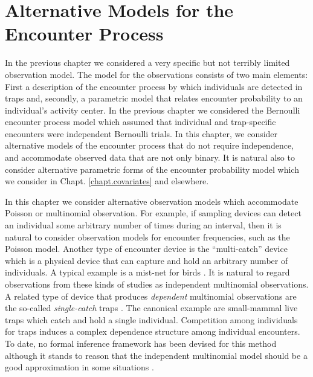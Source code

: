 \chapter{Alternative Models for the Encounter Process}
\label{chapt.poisson-mn}

\vspace{.3in}

In the previous chapter we considered a very specific but not terribly
limited observation model. The model for the observations consists of
two main
elements: First a description of the encounter process by which
individuals are detected in traps and, secondly, a parametric model
that relates encounter probability to an individual's activity
center. 
In the previous chapter we considered the Bernoulli encounter process
model which assumed that individual and 
trap-specific encounters were independent Bernoulli trials. 
In this chapter, we consider alternative models of the encounter
process that do not require independence, and accommodate observed
data that are not only binary. 
 It is natural also to consider alternative parametric forms of 
the encounter probability model which we consider in 
Chapt. \ref{chapt.covariates} and elsewhere.

In this chapter we consider alternative observation models which
accommodate Poisson or multinomial observation. For example, if
sampling devices can detect an individual some arbitrary number of
times during an interval, then it is natural to consider observation
models for encounter frequencies, such as the Poisson model. Another
type of encounter device is the ``multi-catch'' device
\citep{efford_etal:2009euring} which
is a physical device that can capture and hold an arbitrary number of
individuals. A typical example is a mist-net for birds
\citep{borchers_efford:2008}.  It is natural to regard observations
from these kinds of studies as independent multinomial observations.
A related type of device that produces {\it dependent} multinomial
observations are the so-called {\it single-catch} traps
\citep{efford:2004, efford_etal:2009euring}. The canonical example are small-mammal
live traps \citep{converse_etal:2006ea} which catch and hold a single individual. Competition
among individuals for traps induces a complex dependence structure
among individual encounters. To date, no formal inference framework
has been devised for this method although it stands to reason that the
independent multinomial model should be a good approximation in some
situations \citep{efford_etal:2009euring}.  

